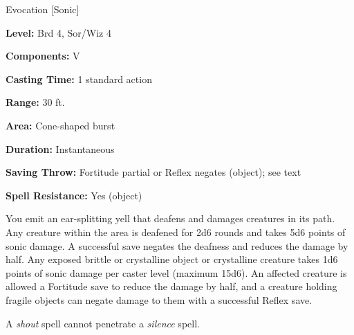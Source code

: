 
Evocation [Sonic]

\textbf{Level:} Brd 4, Sor/Wiz 4

\textbf{Components:} V

\textbf{Casting Time:} 1 standard action

\textbf{Range:} 30 ft.

\textbf{Area:} Cone-shaped burst

\textbf{Duration:} Instantaneous

\textbf{Saving Throw:} Fortitude partial or Reflex negates (object); see text

\textbf{Spell Resistance:} Yes (object)

You emit an ear-splitting yell that deafens and damages creatures in its path. 
Any creature within the area is deafened for 2d6 rounds and takes 5d6 points of 
sonic damage. A successful save negates the deafness and reduces the damage by 
half. Any exposed brittle or crystalline object or crystalline creature takes 1d6 
points of sonic damage per caster level (maximum 15d6). An affected creature is 
allowed a Fortitude save to reduce the damage by half, and a creature holding fragile 
objects can negate damage to them with a successful Reflex save.

A \textit{shout} spell cannot penetrate a \textit{silence} spell.

